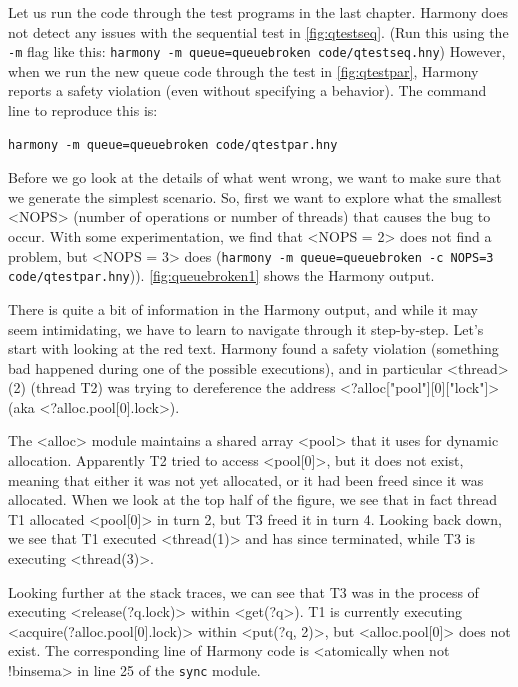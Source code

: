 \documentclass{report}
\newenvironment{code}{
\tcolorbox
}{
\endtcolorbox
}
\begin{document}
Let us run the code through the test programs in the last
chapter.  Harmony does not detect any issues with the sequential test
in \autoref{fig:qtestseq}.
(Run this using the \texttt{-m} flag like this:
\texttt{harmony -m queue=queuebroken code/qtestseq.hny})
However, when we run
the new queue code through the test in \autoref{fig:qtestpar}, Harmony
reports a safety violation (even without specifying a behavior).
The command line to reproduce this is:

\begin{code}
\begin{verbatim}
harmony -m queue=queuebroken code/qtestpar.hny
\end{verbatim}
\end{code}

Before we go look at the details of what went wrong, we want to make
sure that we generate the simplest scenario.  So, first we want to explore
what the smallest <{NOPS}> (number of operations or number of
threads) that causes the bug to occur.  With some experimentation,
we find that <{NOPS = 2}> does not find a problem, but
<{NOPS = 3}> does
(\texttt{harmony -m queue=queuebroken -c NOPS=3 code/qtestpar.hny})).
\autoref{fig:queuebroken1} shows the Harmony output.

There is quite a bit of information in the Harmony output, and while
it may seem intimidating, we have to learn to navigate through it
step-by-step.
Let's start with looking at the red text.  Harmony found a safety
violation (something bad happened during one of the possible executions),
and in particular <{thread}>(2) (thread T2) was trying to dereference
the address <{?alloc["pool"][0]["lock"]}> (aka <{?alloc.pool[0].lock}>).

The <{alloc}> module maintains a shared array <{pool}> that
it uses for dynamic allocation.  Apparently T2 tried to access
<{pool[0]}>, but it does not exist, meaning that either it was not
yet allocated, or it had been freed since it was allocated.
When we look at the top half of the figure, we see that in fact thread
T1 allocated <{pool[0]}> in turn 2, but T3 freed it in turn 4.
Looking back down, we see that T1 executed <{thread(1)}> and has
since terminated, while T3 is executing <{thread(3)}>.

Looking further at the stack traces, we can see that
T3 was in the process of executing
<{release(?q.lock)}> within <{get(?q}>).
T1 is currently executing <{acquire(?alloc.pool[0].lock)}>
within <{put(?q, 2)}>, but 
<{alloc.pool[0]}> does not exist.
The corresponding line of Harmony code is
<{atomically when not !binsema}>
in line 25 of the \texttt{sync} module.
\end{document}
